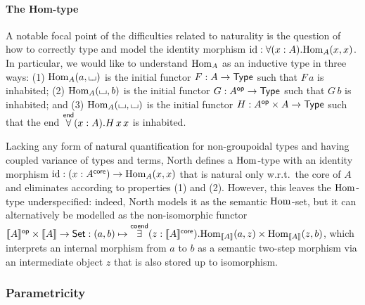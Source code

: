 \documentclass{lmcs} %
\theoremstyle{plain}\newtheorem{satz}[thm]{Satz} %
\theoremstyle{plain}
\theoremstyle{definition}
\begin{document}
\paragraph{The Hom-type}
A notable focal point of the difficulties related to naturality is the question of how to correctly type and model the identity morphism $\mathrm{id}: \forall(x : A).{\mathrm{Hom}}_A(x, x)$.
In particular, we would like to understand ${\mathrm{Hom}}_A$ as an inductive type in three ways: (1) ${\mathrm{Hom}}_A(a, {\llcorner\hspace{-.4ex}\lrcorner})$ is the initial functor $F : A \to {\mathsf{Type}}$ such that $F\,a$ is inhabited; (2) ${\mathrm{Hom}}_A({\llcorner\hspace{-.4ex}\lrcorner}, b)$ is the initial functor $G : A^{\mathsf{op}} \to {\mathsf{Type}}$ such that $G\,b$ is inhabited; and (3) ${\mathrm{Hom}}_A({\llcorner\hspace{-.4ex}\lrcorner}, {\llcorner\hspace{-.4ex}\lrcorner})$ is the initial functor $H : A^{\mathsf{op}} \times A \to {\mathsf{Type}}$ such that the end $\overset{\mathsf{end}}{\forall}(x : A).H\,x\,x$ is inhabited.

Lacking any form of natural quantification for non-groupoidal types and having coupled variance of types and terms, North \cite{north-dirhott} defines a ${\mathrm{Hom}}$-type with an identity morphism $\mathrm{id} : (x : A^{\mathsf{core}}) \to {\mathrm{Hom}}_A(x, x)$ that is natural only w.r.t.\ the core of $A$ and eliminates according to properties (1) and (2).
However, this leaves the ${\mathrm{Hom}}$-type underspecified:
indeed, North models it as the semantic ${\mathrm{Hom}}$-set, but it can alternatively be modelled as the non-isomorphic functor $\mathopen{}\left\llbracket A \right\rrbracket\mathclose{}^{\mathsf{op}} \times \mathopen{}\left\llbracket A \right\rrbracket\mathclose{} \to {\mathsf{Set}} : (a, b) \mapsto \overset{\mathsf{coend}}{\exists}(z : \mathopen{}\left\llbracket A \right\rrbracket\mathclose{}^{\mathsf{core}}).{\mathrm{Hom}}_{\mathopen{}\left\llbracket A \right\rrbracket\mathclose{}}(a, z) \times {\mathrm{Hom}}_{\mathopen{}\left\llbracket A \right\rrbracket\mathclose{}}(z, b)$,
which interprets an internal morphism from $a$ to $b$ as a semantic two-step morphism via an intermediate object $z$ that is also stored up to isomorphism.


\subsubsection{Parametricity}\label{sec:intro:param}
\end{document}

